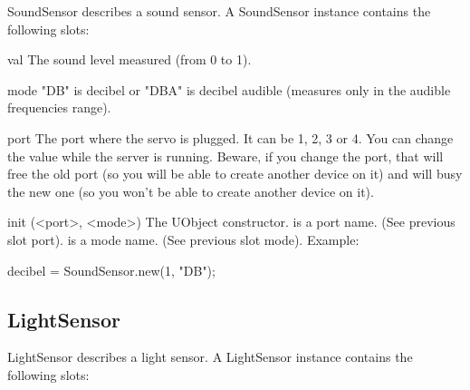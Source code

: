 SoundSensor describes a sound sensor. A SoundSensor instance contains the
following slots:

\begin{urbiscriptapi}

\item[val] The sound level measured (from 0 to 1).

\item[mode] "DB" is decibel or "DBA" is decibel audible (measures only in
  the audible frequencies range).

\item[port] The port where the servo is plugged. It can be 1, 2, 3 or 4. You
  can change the value while the server is running. Beware, if you change
  the port, that will free the old port (so you will be able to create
  another device on it) and will busy the new one (so you won't be able to
  create another device on it).


\item[init](<port>, <mode>) The UObject constructor.  is a port
  name. (See previous slot port).  is a mode name. (See
  previous slot mode). Example:
\begin{urbiunchecked}
  decibel = SoundSensor.new(1, "DB");
\end{urbiunchecked}

\end{urbiscriptapi}

\subsection{LightSensor}

LightSensor describes a light sensor. A LightSensor instance contains the
following slots:

